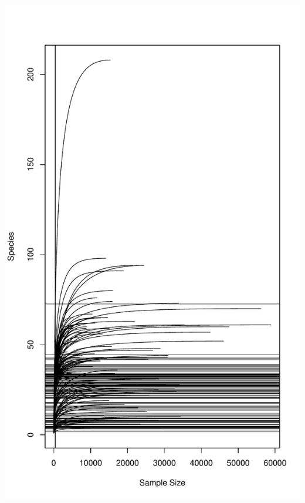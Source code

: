 \documentclass[
]{article}
\begin{document}
\includegraphics[width=1\linewidth]{manuscript_template_files/figure-latex/unnamed-chunk-24-2}
\end{document}
